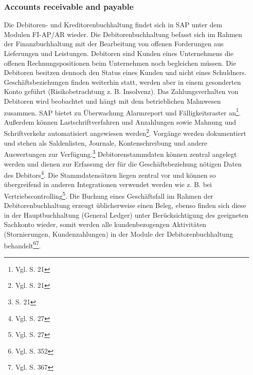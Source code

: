 \subsubsection{Accounts receivable and payable} 
Die Debitoren- und Kreditorenbuchhaltung findet sich in SAP unter dem Modulen FI-AP/AR wieder.
Die Debitorenbuchhaltung befasst sich im Rahmen der Finanzbuchhaltung mit der Bearbeitung von offenen Forderungen aus Lieferungen und Leistungen. Debitoren sind Kunden eines Unternehmens die offenen Rechnungspositionen beim Unternehmen noch begleichen müssen. Die Debitoren besitzen dennoch den Status eines Kunden und nicht eines Schuldners. Geschäftsbeziehungen finden weiterhin statt, werden aber in einem gesonderten Konto geführt (Risikobetrachtung z. B. Insolvenz). Das Zahlungsverhalten von Debitoren wird beobachtet und hängt mit dem betrieblichen Mahnwesen zusammen. SAP bietet zu Überwachung Alarmreport und Fälligkeitsraster an\footnote{Vgl. \cite{SAPFIAPAR2001} S. 21}. Außerdem können Lastschriftverfahren und Anzahlungen sowie Mahnung und Schriftverkehr automatisiert angewiesen werden\footnote{Vgl. \cite{SAPFIAPAR2001} S. 21}. \glqq Vorgänge werden dokumentiert und stehen als Saldenlisten, Journale, Kontenschreibung und andere Auswertungen zur Verfügung.\grqq \footnote{\cite{SAPFIAPAR2001} S. 21} Debitorenstammdaten können zentral angelegt werden und dienen zur Erfassung der für die Geschäftsbeziehung nötigen Daten des Debitors\footnote{Vgl. \cite{SAPFIAPAR2001} S. 27}. Die Stammdatensätzen liegen zentral vor und können so übergreifend in anderen Integrationen verwendet werden wie z. B. bei Vertriebscontrolling\footnote{Vgl. \cite{SAPFIAPAR2001} S. 27}. Die Buchung eines Geschäftsfall im Rahmen der Debitorenbuchhaltung erzeugt üblicherweise einen Beleg, ebenso finden sich diese in der Hauptbuchhaltung (General Ledger) unter Berücksichtigung des geeigneten Sachkonto wieder, somit werden alle kundenbezogengen Aktivitäten (Stornierungen, Kundenzahlungen) in der Module der Debitorenbuchhaltung behandelt\footnote{Vgl. \cite{SAPFIAPAR2001} S. 352}\footnote{Vgl. \cite{SAPFIAPAR2001} S. 367}.

